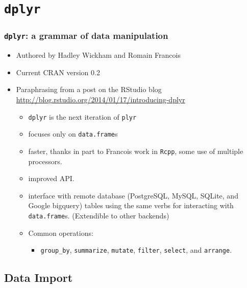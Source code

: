 \documentclass{beamer}\usepackage[]{graphicx}\usepackage[]{color}
\begin{document}
\section{{\tt dplyr}}%
\begin{frame}[fragile]
  \frametitle{{\tt dplyr}: a grammar of data manipulation}
  \begin{itemize}
    \item Authored by Hadley Wickham and Romain Francois
    \item Current CRAN version 0.2

    \item<2-> Paraphrasing from a post on the RStudio blog
      \url{http://blog.rstudio.org/2014/01/17/introducing-dplyr}

      \begin{itemize}
        \item {\tt dplyr} is the next iteration of {\tt plyr}
        \item focuses only on {\tt data.frame}s
        \item faster, thanks in part to Francois work in {\tt Rcpp}, some use of
          multiple processors.
        \item improved API. 
        \item interface with remote database (PostgreSQL, MySQL, SQLite, and
          Google bigquery) tables using the same verbs for
          interacting with {\tt data.frame}s.  (Extendible to other backends)
        \item Common operations:
          \begin{itemize}
            \item {\tt group\_by}, {\tt summarize}, {\tt mutate}, {\tt filter},
              {\tt select}, and {\tt arrange}.
          \end{itemize}
      \end{itemize}

  \end{itemize}
\end{frame} 

\subsection{Data Import}%
\end{document}
